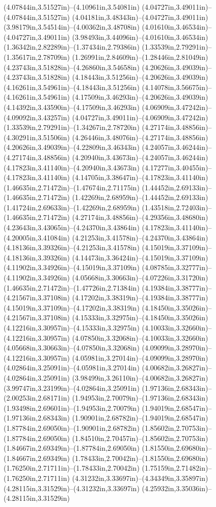 (4.07844in,3.51527in)--(4.10961in,3.54081in) (4.04727in,3.49011in)--(4.07844in,3.51527in) (4.04181in,3.48343in)--(4.04727in,3.49011in) (3.98179in,3.54514in)--(4.00362in,3.48708in) (4.01610in,3.46534in)--(4.04727in,3.49011in) (3.98493in,3.44096in)--(4.01610in,3.46534in) (1.36342in,2.82289in)--(1.37434in,2.79386in) (1.33539in,2.79291in)--(1.35617in,2.78709in) (1.26991in,2.84609in)--(1.28446in,2.81049in) (4.23743in,3.51828in)--(4.26860in,3.54658in) (4.20626in,3.49039in)--(4.23743in,3.51828in) (4.18443in,3.51256in)--(4.20626in,3.49039in) (4.16261in,3.54961in)--(4.18443in,3.51256in) (4.14078in,3.56675in)--(4.16261in,3.54961in) (4.17509in,3.46293in)--(4.20626in,3.49039in) (4.14392in,3.43590in)--(4.17509in,3.46293in) (4.06909in,3.47242in)--(4.09092in,3.43257in) (4.04727in,3.49011in)--(4.06909in,3.47242in) (1.33539in,2.79291in)--(1.34267in,2.78720in) (4.27174in,3.48856in)--(4.30291in,3.51506in) (4.26446in,3.48076in)--(4.27174in,3.48856in) (4.20626in,3.49039in)--(4.22809in,3.46343in) (4.24057in,3.46244in)--(4.27174in,3.48856in) (4.20940in,3.43673in)--(4.24057in,3.46244in) (4.17823in,3.41140in)--(4.20940in,3.43673in) (4.17277in,3.40455in)--(4.17823in,3.41140in) (4.14705in,3.38647in)--(4.17823in,3.41140in) (1.46635in,2.71472in)--(1.47674in,2.71175in) (1.44452in,2.69133in)--(1.46635in,2.71472in) (1.42269in,2.68959in)--(1.44452in,2.69133in) (1.41724in,2.69633in)--(1.42269in,2.68959in) (1.43518in,2.72403in)--(1.46635in,2.71472in) (4.27174in,3.48856in)--(4.29356in,3.48680in) (4.23643in,3.43065in)--(4.24370in,3.43864in) (4.17823in,3.41140in)--(4.20005in,3.41084in) (4.21253in,3.41578in)--(4.24370in,3.43864in) (4.18136in,3.39326in)--(4.21253in,3.41578in) (4.15019in,3.37109in)--(4.18136in,3.39326in) (4.14473in,3.36424in)--(4.15019in,3.37109in) (4.11902in,3.34926in)--(4.15019in,3.37109in) (4.08785in,3.32777in)--(4.11902in,3.34926in) (4.05668in,3.30663in)--(4.07226in,3.31720in) (1.46635in,2.71472in)--(1.47726in,2.71384in) (4.19384in,3.38777in)--(4.21567in,3.37108in) (4.17202in,3.38319in)--(4.19384in,3.38777in) (4.15019in,3.37109in)--(4.17202in,3.38319in) (4.18450in,3.35026in)--(4.21567in,3.37108in) (4.15333in,3.32975in)--(4.18450in,3.35026in) (4.12216in,3.30957in)--(4.15333in,3.32975in) (4.10033in,3.32660in)--(4.12216in,3.30957in) (4.07850in,3.32068in)--(4.10033in,3.32660in) (4.05668in,3.30663in)--(4.07850in,3.32068in) (4.09099in,3.28970in)--(4.12216in,3.30957in) (4.05981in,3.27014in)--(4.09099in,3.28970in) (4.02864in,3.25091in)--(4.05981in,3.27014in) (4.00682in,3.26827in)--(4.02864in,3.25091in) (3.98499in,3.26110in)--(4.00682in,3.26827in) (3.99747in,3.23199in)--(4.02864in,3.25091in) (1.97136in,2.68343in)--(2.00253in,2.68171in) (1.94953in,2.70079in)--(1.97136in,2.68343in) (1.93498in,2.69601in)--(1.94953in,2.70079in) (1.94019in,2.68547in)--(1.97136in,2.68343in) (1.90901in,2.68782in)--(1.94019in,2.68547in) (1.87784in,2.69050in)--(1.90901in,2.68782in) (1.85602in,2.70753in)--(1.87784in,2.69050in) (1.84510in,2.70457in)--(1.85602in,2.70753in) (1.84667in,2.69349in)--(1.87784in,2.69050in) (1.81550in,2.69680in)--(1.84667in,2.69349in) (1.78433in,2.70042in)--(1.81550in,2.69680in) (1.76250in,2.71711in)--(1.78433in,2.70042in) (1.75159in,2.71482in)--(1.76250in,2.71711in) (4.31232in,3.33697in)--(4.34349in,3.35897in) (4.28115in,3.31529in)--(4.31232in,3.33697in) (4.25932in,3.35036in)--(4.28115in,3.31529in) 